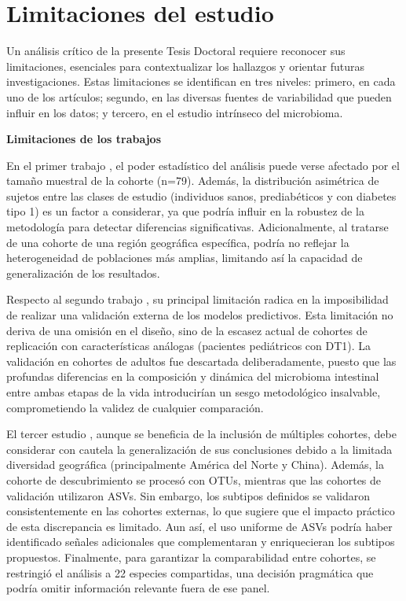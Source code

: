 \section{Limitaciones del estudio}

Un análisis crítico de la presente Tesis Doctoral requiere reconocer sus limitaciones, esenciales para contextualizar los hallazgos y orientar futuras investigaciones. Estas limitaciones se identifican en tres niveles: primero, en cada uno de los artículos; segundo, en las diversas fuentes de variabilidad que pueden influir en los datos; y tercero, en el estudio intrínseco del microbioma.

\textbf{Limitaciones de los trabajos}

En el primer trabajo \cite{paper1}, el poder estadístico del análisis puede verse afectado por el tamaño muestral de la cohorte (n=79). Además, la distribución asimétrica de sujetos entre las clases de estudio (individuos sanos, prediabéticos y con diabetes tipo 1) es un factor a considerar, ya que podría influir en la robustez de la metodología para detectar diferencias significativas. Adicionalmente, al tratarse de una cohorte de una región geográfica específica, podría no reflejar la heterogeneidad de poblaciones más amplias, limitando así la capacidad de generalización de los resultados.

Respecto al segundo trabajo \cite{paper2}, su principal limitación radica en la imposibilidad de realizar una validación externa de los modelos predictivos. Esta limitación no deriva de una omisión en el diseño, sino de la escasez actual de cohortes de replicación con características análogas (pacientes pediátricos con DT1). La validación en cohortes de adultos fue descartada deliberadamente, puesto que las profundas diferencias en la composición y dinámica del microbioma intestinal entre ambas etapas de la vida introducirían un sesgo metodológico insalvable, comprometiendo la validez de cualquier comparación.

El tercer estudio \cite{paper3}, aunque se beneficia de la inclusión de múltiples cohortes, debe considerar con cautela la generalización de sus conclusiones debido a la limitada diversidad geográfica (principalmente América del Norte y China). Además, la cohorte de descubrimiento se procesó con OTUs, mientras que las cohortes de validación utilizaron ASVs. Sin embargo, los subtipos definidos se validaron consistentemente en las cohortes externas, lo que sugiere que el impacto práctico de esta discrepancia es limitado. Aun así, el uso uniforme de ASVs podría haber identificado señales adicionales que complementaran y enriquecieran los subtipos propuestos. Finalmente, para garantizar la comparabilidad entre cohortes, se restringió el análisis a 22 especies compartidas, una decisión pragmática que podría omitir información relevante fuera de ese panel.

